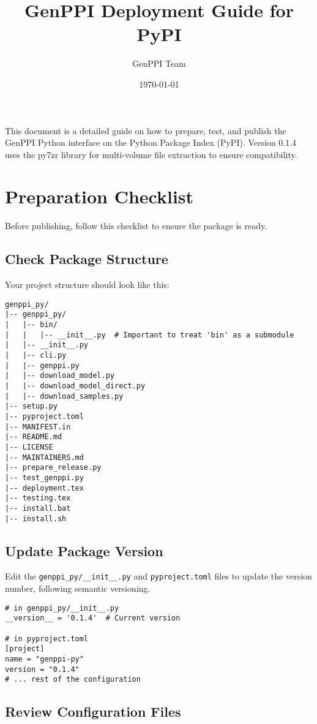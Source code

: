 \documentclass[11pt, a4paper]{article}
\title{\bfseries GenPPI Deployment Guide for PyPI}
\author{GenPPI Team}
\date{\today}
\begin{document}
\maketitle

This document is a detailed guide on how to prepare, test, and publish the GenPPI Python interface on the Python Package Index (PyPI). Version 0.1.4 uses the py7zr library for multi-volume file extraction to ensure compatibility.

\section{Preparation Checklist}

Before publishing, follow this checklist to ensure the package is ready.

\subsection{Check Package Structure}
Your project structure should look like this:
\begin{verbatim}
genppi_py/
|-- genppi_py/
|   |-- bin/
|   |   |-- __init__.py  # Important to treat 'bin' as a submodule
|   |-- __init__.py
|   |-- cli.py
|   |-- genppi.py
|   |-- download_model.py
|   |-- download_model_direct.py
|   |-- download_samples.py
|-- setup.py
|-- pyproject.toml
|-- MANIFEST.in
|-- README.md
|-- LICENSE
|-- MAINTAINERS.md
|-- prepare_release.py
|-- test_genppi.py
|-- deployment.tex
|-- testing.tex
|-- install.bat
|-- install.sh
\end{verbatim}

\subsection{Update Package Version}
Edit the \texttt{genppi\_py/\_\_init\_\_.py} and \texttt{pyproject.toml} files to update the version number, following semantic versioning.
\begin{lstlisting}[style=pythonstyle]
# in genppi_py/__init__.py
__version__ = '0.1.4'  # Current version

# in pyproject.toml
[project]
name = "genppi-py"
version = "0.1.4"
# ... rest of the configuration
\end{lstlisting}

\subsection{Review Configuration Files}
\end{document}
